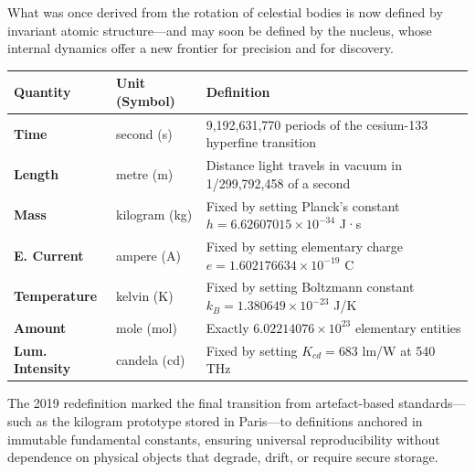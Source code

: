 What was once derived from the rotation of celestial bodies is now defined by invariant atomic structure—and may soon be defined by the nucleus, whose internal dynamics offer a new frontier for precision and for discovery.



\begin{tcolorbox}[
    enhanced,
    colframe=technicalcolor,
    colback=gray!5,
    boxrule=0.8pt,
    arc=0mm,
    left=8pt,
    right=8pt,
    top=8pt,
    bottom=8pt,
    title={\textbf{The Seven SI Base Units}},
    fonttitle=\bfseries,
    coltitle=white,
    colbacktitle=technicalcolor
]
\small
\renewcommand{\arraystretch}{1.3}
\begin{center}
\begin{tabular}{>{\bfseries}l l p{5.5cm}}
\toprule
\textbf{Quantity} & \textbf{Unit (Symbol)} & \textbf{Definition} \\
\midrule
Time & second (s) & 9,192,631,770 periods of the cesium-133 hyperfine transition \\[6pt]
Length & metre (m) & Distance light travels in vacuum in 1/299,792,458 of a second \\[6pt]
Mass & kilogram (kg) & Fixed by setting Planck's constant $h = 6.62607015 \times 10^{-34}$ J·s \\[6pt]
E. Current & ampere (A) & Fixed by setting elementary charge $e = 1.602176634 \times 10^{-19}$ C \\[6pt]
Temperature & kelvin (K) & Fixed by setting Boltzmann constant $k_B = 1.380649 \times 10^{-23}$ J/K \\[6pt]
Amount & mole (mol) & Exactly $6.02214076 \times 10^{23}$ elementary entities \\[6pt]
Lum. Intensity & candela (cd) & Fixed by setting $K_{cd} = 683$ lm/W at 540 THz \\[6pt]
\bottomrule
\end{tabular}
\end{center}

\vspace{0.5em}
\footnotesize\centering
The 2019 redefinition marked the final transition from artefact-based standards—such as the kilogram prototype stored in Paris—to definitions anchored in immutable fundamental constants, ensuring universal reproducibility without dependence on physical objects that degrade, drift, or require secure storage.
\end{tcolorbox}